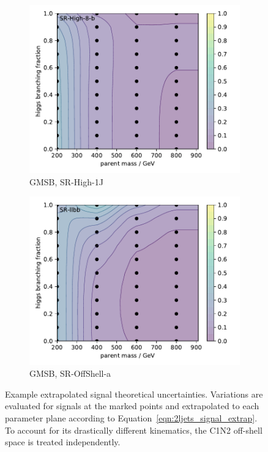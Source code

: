 \begin{figure}[tp]
\begin{subfigure}{0.48\textwidth}
\centering
\includegraphics[width=\textwidth]{figures/2ljets_signal_sys_gmsb_SRHigh8_2.pdf}
\caption{GMSB, SR-High-1J}
\end{subfigure}
\hfill
\begin{subfigure}{0.48\textwidth}
\centering
\includegraphics[width=\textwidth]{figures/2ljets_signal_sys_gmsb_SRllbb.pdf}
\caption{GMSB, SR-OffShell-a}
\end{subfigure}
\caption[
Example extrapolated signal theoretical uncertainties
]{%
Example extrapolated signal theoretical uncertainties.
Variations are evaluated for signals at the marked points and extrapolated to
each parameter plane according to Equation~\ref{eqn:2ljets_signal_extrap}.
To account for its drastically different kinematics, the C1N2 off-shell space
is treated independently.
}
\label{fig:2ljets_signal_sys_extrap}
\end{figure}

